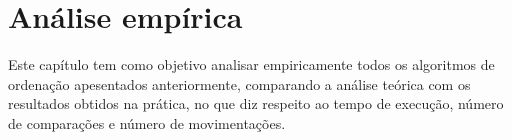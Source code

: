 \chapter{Análise empírica}
Este capítulo tem como objetivo analisar empiricamente todos os algoritmos de ordenação apesentados anteriormente, comparando a análise teórica com os resultados obtidos na prática, no que diz respeito ao tempo de execução, número de comparações e número de movimentações.





